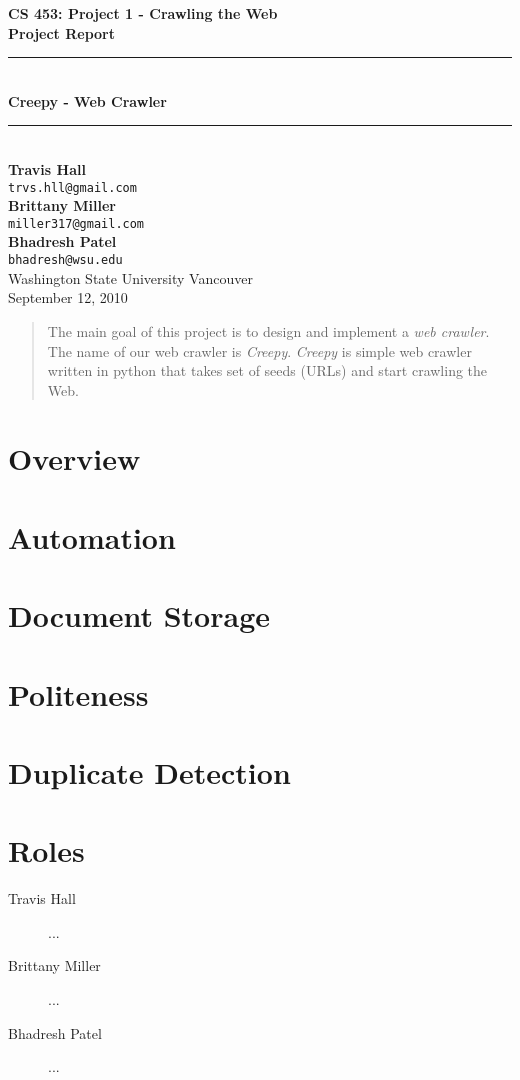 \documentclass[letterpaper,11pt,twoside]{article}
\begin{document}
\begin{titlepage}
   \begin{center}
       {\Large \textbf{CS 453: Project 1 - Crawling the Web}}\\[0.5cm]
       {\Large \textbf{Project Report}}\\[3.0cm]

       {\rule{\linewidth}{0.5mm}} \\[0.5cm]
       {\Huge \textbf{Creepy - Web Crawler}}\\[0.4cm] 
       {\rule{\linewidth}{0.5mm}} \\[2.0cm]

       \textbf{Travis Hall}\\
       \texttt{trvs.hll@gmail.com}\\[0.5cm]
       \textbf{Brittany Miller}\\
       \texttt{miller317@gmail.com}\\[0.5cm]
       \textbf{Bhadresh Patel}\\
       \texttt{bhadresh@wsu.edu}\\[0.5cm]

       \vfill
       Washington State University Vancouver\\
       September 12, 2010
   \end{center}
\end{titlepage}

\begin{abstract}
The main goal of this project is to design and implement a \emph{web crawler}. The name of our web crawler is \emph{Creepy}. \emph{Creepy} is simple web crawler written in python that takes set of seeds (URLs) and start crawling the Web.
\end{abstract}

\section{Overview}

\section{Automation}

\section{Document Storage}

\section{Politeness}

\section{Duplicate Detection}

\section{Roles}

\begin{description}
 \item[Travis Hall] ...
 \item[Brittany Miller] ... 
 \item[Bhadresh Patel] ...
\end{description}
\end{document}
